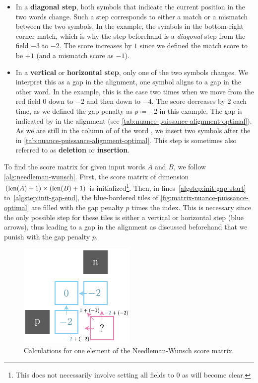 \begin{itemize}

    \item In a \textbf{diagonal step}, both symbols that indicate the current position in the two words change. Such a step corresponds to either a match or a mismatch between the two symbols. In the example, the  symbols in the bottom-right corner match, which is why the step beforehand is a \textit{diagonal} step from the field $-3$ to $-2$. The score increases by $1$ since we defined the match score to be $+1$ (and a mismatch score as $-1$).

    \item In a \textbf{vertical} or \textbf{horizontal step}, only one of the two symbols changes. We interpret this as a gap in the alignment, \ie one symbol aligns to a gap in the other word. In the example, this is the case two times when we move from the red field $0$ down to $-2$ and then down to $-4$. The score decreases by $2$ each time, as we defined the gap penalty as $p \coloneqq -2$ in this example. The gap is indicated by \q{--} in the alignment (see \autoref{tab:nuance-puissance-alignment-optimal}). As we are still in the column of \textipa{/\textturnh/} of the word , we insert two \q{--} symbols after the \textipa{/\textturnh/} in \autoref{tab:nuance-puissance-alignment-optimal}. This step is sometimes also referred to as \textbf{deletion} or \textbf{insertion}.
    
\end{itemize}

To find the score matrix for given input words $A$ and $B$, we follow \autoref{alg:needleman-wunsch}. First, the score matrix of dimension $(\text{len}(A)+1) \times (\text{len}(B)+1)$ is initialized\footnote{This does not necessarily involve setting all fields to $0$ as will become clear.}. Then, in lines~\ref{algstep:init-gap-start} to~\ref{algstep:init-gap-end}, the blue-bordered tiles of \autoref{fig:matrix-nuance-puissance-optimal} are filled with the gap penalty $p$ times the index. This is necessary since the only possible step for these tiles is either a vertical or horizontal step (blue arrows), thus leading to a gap in the alignment as discussed beforehand that we punish with the gap penalty $p$.

\begin{figure}[H]
    \centering
    \includegraphics[width=0.5\linewidth]{assets/illustrator/matrix-nuance-puissance-subcalc.pdf}
    \caption{Calculations for one element of the Needleman-Wunsch score matrix.}
    \label{fig:matrix-nuance-puissance-subcalc}
\end{figure}


